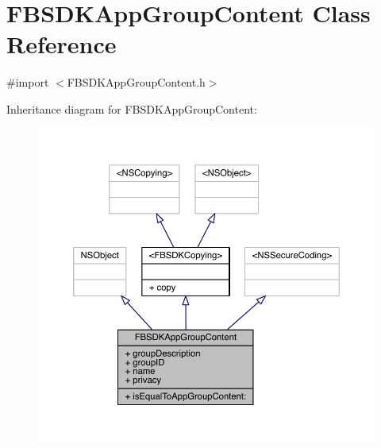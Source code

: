 \hypertarget{interface_f_b_s_d_k_app_group_content}{\section{F\-B\-S\-D\-K\-App\-Group\-Content Class Reference}
\label{interface_f_b_s_d_k_app_group_content}
}


{\ttfamily \#import $<$F\-B\-S\-D\-K\-App\-Group\-Content.\-h$>$}



Inheritance diagram for F\-B\-S\-D\-K\-App\-Group\-Content\-:
\nopagebreak
\begin{figure}[H]
\begin{center}
\leavevmode
\includegraphics[width=350pt]{interface_f_b_s_d_k_app_group_content__inherit__graph}
\end{center}
\end{figure}


